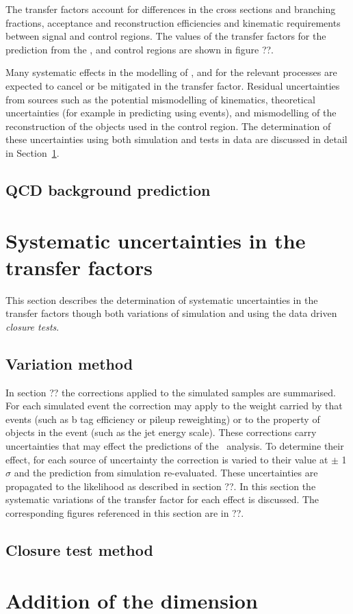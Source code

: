 The transfer factors account for differences in the cross sections and branching fractions,
acceptance and reconstruction efficiencies and kinematic requirements between signal 
and control regions. The values of the transfer factors for the prediction from the \mj,
\mmj and \gj control regions are shown in figure ??.

Many systematic effects in the modelling of \scalht, \nb and \njet for the relevant processes 
are expected to cancel or be mitigated in the transfer factor. Residual uncertainties from
sources such as the potential mismodelling of kinematics, theoretical uncertainties (for example
in predicting \znunu using \gj events), and mismodelling of the reconstruction of the objects
used in the control region. The determination of these uncertainties using both simulation 
and tests in data are discussed in detail in Section~\ref{sec:syst-uncs}. 

\subsection{QCD background prediction}
\section{Systematic uncertainties in the transfer factors}
\label{sec:syst-uncs}
This section describes the determination of systematic uncertainties 
in the transfer factors though both variations of simulation
and using the data driven \emph{closure tests}. 

\subsection{Variation method}
In section ?? the corrections applied to the simulated samples are summarised. For each 
simulated event the correction may apply to the weight carried by that events (such as b tag efficiency
or pileup reweighting) or to the property of objects in the event (such as the jet energy scale). 
These corrections carry uncertainties that may effect the predictions of the \alphat~analysis.
To determine their effect, for each source of uncertainty the correction is varied to their
value at $\pm$ 1 $\sigma$ and the prediction from simulation re-evaluated. These uncertainties are
propagated to the likelihood as described in section ??. In this section the systematic variations
of the transfer factor for each effect is discussed. The corresponding figures referenced in
this section are in ??.

\subsection{Closure test method}
\section{Addition of the \mht dimension}
